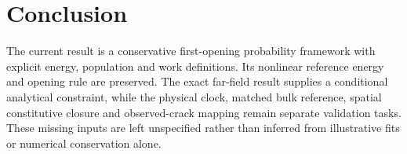 \documentclass[11pt]{article}
\begin{document}
\section{Conclusion}
The current result is a conservative first-opening probability framework with
explicit energy, population and work definitions. Its nonlinear reference
energy and opening rule are preserved. The exact far-field result supplies
a conditional analytical constraint, while the physical clock, matched bulk
reference, spatial constitutive closure and observed-crack mapping remain
separate validation tasks. These missing inputs are left unspecified rather
than inferred from illustrative fits or numerical conservation alone.



\end{document}
